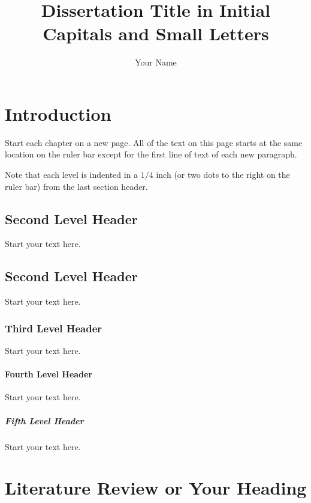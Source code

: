 \documentclass[debug, font=Times]{gw-dissertation}[2021/11/19]
\title{Dissertation Title in Initial Capitals and Small Letters}
\author{Your Name}
\begin{document}
\chapter{Introduction}

Start each chapter on a new page. All of the text on this page starts at the same location on the
ruler bar except for the first line of text of each new paragraph.

Note that each level is indented in a $1/4$ inch (or two dots to the right on the ruler bar) from
the last section header. 

    \section{Second Level Header}
    Start your text here.

    \section{Second Level Header}
    Start your text here.

        \subsection{Third Level Header}
        Start your text here.

            \subsubsection{Fourth Level Header}
            Start your text here.

                \paragraph{Fifth Level Header}
                Start your text here.

\chapter{Literature Review or Your Heading}
\end{document}
